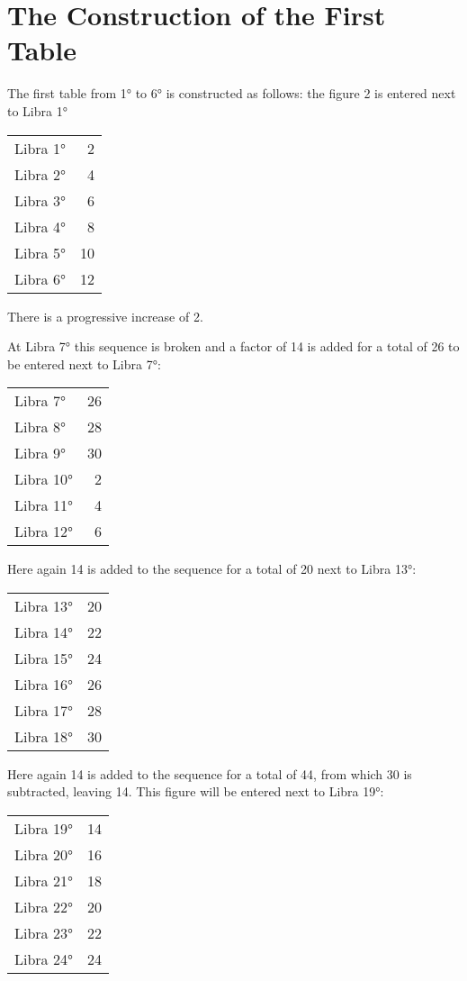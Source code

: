 \section{The Construction of the First Table}

The first table from 1° to 6° is constructed as follows: the figure 2 is entered next to Libra 1°

\begin{tabular}{lr}
Libra 1° & 2 \\
Libra 2° & 4 \\
Libra 3° & 6 \\
Libra 4° & 8 \\
Libra 5° & 10 \\
Libra 6° & 12 \\
\end{tabular}

There is a progressive increase of 2.

At Libra 7° this sequence is broken and a factor of 14 is added for a total of 26 to be entered next to Libra 7°:

\begin{tabular}{lr}
Libra 7° & 26 \\
Libra 8° & 28 \\
Libra 9° & 30 \\ 
Libra 10°  & 2 \\
Libra 11°  & 4 \\
Libra 12°  & 6 \\
\end{tabular}

Here again 14 is added to the sequence for a total of 20 next to Libra 13°:

\begin{tabular}{lr}
Libra 13° & 20 \\
Libra 14° & 22 \\
Libra 15° & 24 \\
Libra 16° & 26 \\
Libra 17° & 28 \\
Libra 18° & 30 \\
\end{tabular}

Here again 14 is added to the sequence for a total of 44, from which 30 is subtracted, leaving 14. This figure will be entered next to Libra 19°:

\begin{tabular}{lr}
Libra 19° & 14 \\
Libra 20° & 16 \\
Libra 21° & 18 \\
Libra 22° & 20 \\
Libra 23° & 22 \\ 
Libra 24° & 24 \\
\end{tabular}

